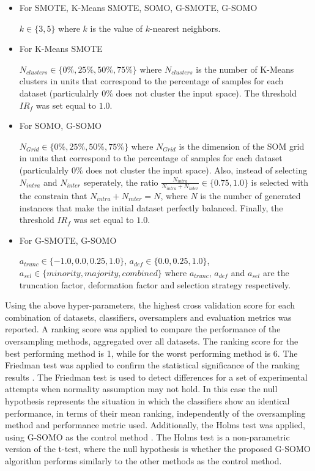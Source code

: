 \documentclass[parskip=full]{scrartcl}
\begin{document}
\begin{itemize}

	\renewcommand\labelitemi{--}

	\item For SMOTE, K-Means SMOTE, SOMO, G-SMOTE, G-SOMO
	
	$k \in \{3, 5 \}$ where $k$ is the value of $k$-nearest neighbors.

	\item For K-Means SMOTE
	
	$ N_{clusters} \in \{0\%, 25\%, 50\%, 75\% \} $ where $N_{clusters}$ is the number of K-Means clusters in units that correspond to the percentage of samples for each dataset (particulalrly $ 0\% $ does not cluster the input space). The threshold $ IR_{f} $ was set equal to $ 1.0 $.

	\item For SOMO, G-SOMO

	$ N_{Grid} \in \{0\%, 25\%, 50\%, 75\% \} $ where $N_{Grid}$ is the dimension of the SOM grid in units that correspond to the percentage of samples for each dataset (particulalrly $ 0\% $ does not cluster the input space). Also, instead of selecting $N_{intra}$ and $N_{inter}$ seperately, the ratio $ \frac{N_{intra}}{N_{intra} + N_{inter}} \in \{0.75, 1.0 \} $ is selected with the constrain that $N_{intra} + N_{inter} = N$, where $N$ is the number of generated instances that make the initial dataset perfectly balanced. Finally, the threshold $ IR_{f} $ was set equal to $ 1.0 $.

	\item For G-SMOTE, G-SOMO
	
	$ a_{trunc} \in \{-1.0, 0.0, 0.25, 1.0\} $, $ a_{def} \in \{0.0, 0.25, 1.0\} $,  $ a_{sel} \in \{ minority, majority, combined \} $ where $a_{trunc}$, $a_{def}$ and $a_{sel}$ are the truncation factor, deformation factor and selection strategy respectively.

\end{itemize}

Using the above hyper-parameters, the highest cross validation score for each combination of datasets, classifiers, oversamplers and evaluation metrics was reported. A ranking score was applied to compare the performance of the oversampling methods, aggregated over all datasets. The ranking score for the best performing method is 1, while for the worst performing method is 6. The Friedman test was applied to confirm the statistical significance of the ranking results \cite{Guyon2003}. The Friedman test is used to detect differences for a set of experimental attempts when normality assumption may not hold. In this case the null hypothesis represents the situation in which the classifiers show an identical performance, in terms of their mean ranking, independently of the oversampling method and performance metric used. Additionally, the Holms test was applied, using G-SOMO as the control method \cite{Guyon2003}. The Holms test is a non-parametric version of the t-test, where the null hypothesis is whether the proposed G-SOMO algorithm performs similarly to the other methods as the control method.
\end{document}
